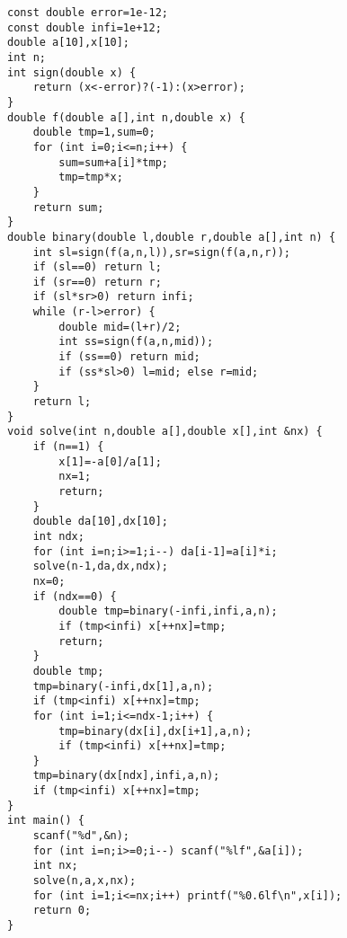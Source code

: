 \begin{lstlisting}
const double error=1e-12;
const double infi=1e+12;
double a[10],x[10];
int n;
int sign(double x) {
	return (x<-error)?(-1):(x>error);
}
double f(double a[],int n,double x) {
	double tmp=1,sum=0;
	for (int i=0;i<=n;i++) {
		sum=sum+a[i]*tmp;
		tmp=tmp*x;
	}
	return sum;
}
double binary(double l,double r,double a[],int n) {
	int sl=sign(f(a,n,l)),sr=sign(f(a,n,r));
	if (sl==0) return l;
	if (sr==0) return r;
	if (sl*sr>0) return infi;
	while (r-l>error) {
		double mid=(l+r)/2;
		int ss=sign(f(a,n,mid));
		if (ss==0) return mid;
		if (ss*sl>0) l=mid; else r=mid;
	}
	return l;
}
void solve(int n,double a[],double x[],int &nx) {
	if (n==1) {
		x[1]=-a[0]/a[1];
		nx=1;
		return;
	}
	double da[10],dx[10];
	int ndx;
	for (int i=n;i>=1;i--) da[i-1]=a[i]*i;
	solve(n-1,da,dx,ndx);
	nx=0;
	if (ndx==0) {
		double tmp=binary(-infi,infi,a,n);
		if (tmp<infi) x[++nx]=tmp;
		return;
	}
	double tmp;
	tmp=binary(-infi,dx[1],a,n);
	if (tmp<infi) x[++nx]=tmp;
	for (int i=1;i<=ndx-1;i++) {
		tmp=binary(dx[i],dx[i+1],a,n);
		if (tmp<infi) x[++nx]=tmp;
	}
	tmp=binary(dx[ndx],infi,a,n);
	if (tmp<infi) x[++nx]=tmp;
}
int main() {
	scanf("%d",&n);
	for (int i=n;i>=0;i--) scanf("%lf",&a[i]);
	int nx;
	solve(n,a,x,nx);
	for (int i=1;i<=nx;i++) printf("%0.6lf\n",x[i]);
	return 0;
}
\end{lstlisting}
